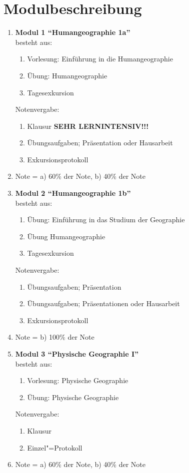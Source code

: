\section{Modulbeschreibung}
\begin{enumerate}
 \item \textbf{Modul 1 ``Humangeographie 1a''}\\ besteht aus:
  \begin{enumerate}
   \item Vorlesung: Einführung in die Humangeographie
   \item Übung: Humangeographie
   \item Tagesexkursion
  \end{enumerate}
  Notenvergabe:
  \begin{enumerate}
   \item Klausur \textbf{SEHR LERNINTENSIV!!!}
   \item Übungsaufgaben; Präsentation oder Hausarbeit
   \item Exkursionsprotokoll
  \end{enumerate}    %
  \item[] Note = a) 60\% der Note, b) 40\% der Note

 \item \textbf{Modul 2 ``Humangeographie 1b''} \\ besteht aus:
  \begin{enumerate}
   \item Übung: Einführung in das Studium der Geographie
   \item Übung Humangeographie
   \item Tagesexkursion
  \end{enumerate}
  Notenvergabe:
  \begin{enumerate}
   \item Übungsaufgaben; Präsentation
   \item Übungsaufgaben; Präsentationen oder Hausarbeit
   \item Exkursionsprotokoll
  \end{enumerate}
  \item[] Note = b) 100\% der Note

 \item \textbf{Modul 3 ``Physische Geographie I''}  \\ besteht aus:
  \begin{enumerate}
   \item Vorlesung: Physische Geographie
   \item Übung: Physische Geographie
  \end{enumerate}
  Notenvergabe:
  \begin{enumerate}
   \item Klausur
   \item Einzel"=Protokoll
  \end{enumerate}
  \item[] Note = a) 60\% der Note, b) 40\% der Note


\end{enumerate}
